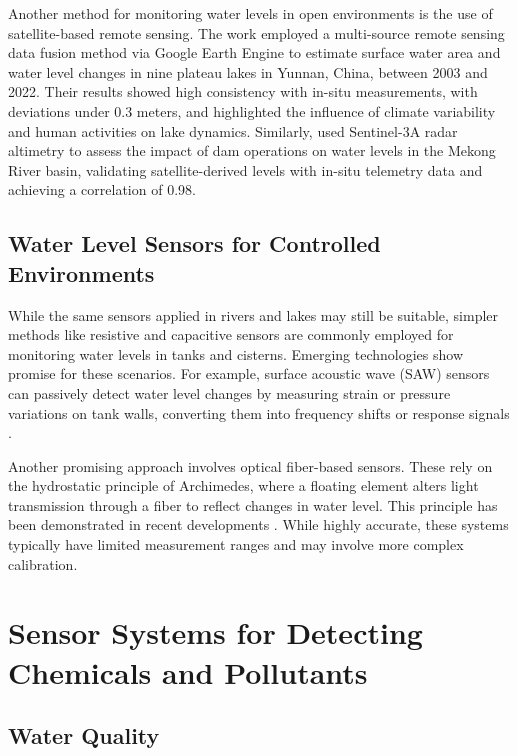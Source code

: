 \documentclass[conference]{IEEEtran}
\begin{document}
Another method for monitoring water levels in open environments is the use of satellite-based remote sensing. The work \cite{jiang_2024_monitoring} employed a multi-source remote sensing data fusion method via Google Earth Engine to estimate surface water area and water level changes in nine plateau lakes in Yunnan, China, between 2003 and 2022. Their results showed high consistency with in-situ measurements, with deviations under 0.3 meters, and highlighted the influence of climate variability and human activities on lake dynamics. Similarly, \cite{ali_2024_satellite} used Sentinel-3A radar altimetry to assess the impact of dam operations on water levels in the Mekong River basin, validating satellite-derived levels with in-situ telemetry data and achieving a correlation of 0.98.

\subsection{Water Level Sensors for Controlled Environments}

While the same sensors applied in rivers and lakes may still be suitable, simpler methods like resistive and capacitive sensors are commonly employed for monitoring water levels in tanks and cisterns. Emerging technologies show promise for these scenarios. For example, surface acoustic wave (SAW) sensors can passively detect water level changes by measuring strain or pressure variations on tank walls, converting them into frequency shifts or response signals \cite{ali_2020_saw, sreejith_2024_modeling}.
 
Another promising approach involves optical fiber-based sensors. These rely on the hydrostatic principle of Archimedes, where a floating element alters light transmission through a fiber to reflect changes in water level. This principle has been demonstrated in recent developments \cite{ramos_2025_high}. While highly accurate, these systems typically have limited measurement ranges and may involve more complex calibration.

\section{Sensor Systems for Detecting Chemicals and Pollutants}

\subsection{Water Quality}
\end{document}
